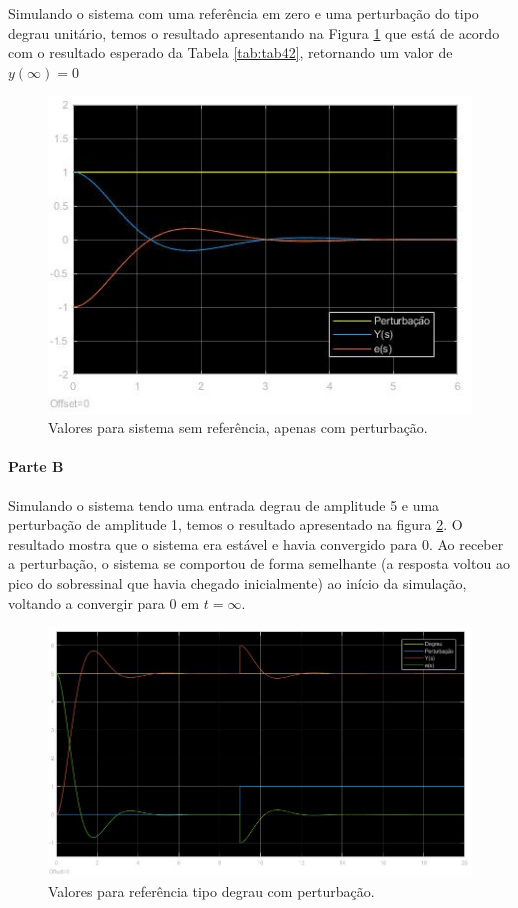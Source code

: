 \documentclass[
]{book}
\theoremstyle{definition}
\theoremstyle{definition}
\theoremstyle{definition}
\theoremstyle{remark}
\begin{document}
Simulando o sistema com uma referência em zero e uma perturbação do tipo degrau unitário, temos o resultado apresentando na Figura \ref{fig:fig43A1} que está de acordo com o resultado esperado da Tabela \ref{tab:tab42}, retornando um valor de \(y(\infty) = 0\)

\begin{figure}
\includegraphics[width=0.8\linewidth]{Imagens/Lab4/Resolução/prob3A1} \caption{Valores para sistema sem referência, apenas com perturbação.}\label{fig:fig43A1}
\end{figure}

\hypertarget{parte-b-2}{%
\paragraph*{Parte B}\label{parte-b-2}}

Simulando o sistema tendo uma entrada degrau de amplitude 5 e uma perturbação de amplitude 1, temos o resultado apresentado na figura \ref{fig:fig43B1}. O resultado mostra que o sistema era estável e havia convergido para 0. Ao receber a perturbação, o sistema se comportou de forma semelhante (a resposta voltou ao pico do sobressinal que havia chegado inicialmente) ao início da simulação, voltando a convergir para 0 em \(t=\infty\).

\begin{figure}
\includegraphics[width=0.8\linewidth]{Imagens/Lab4/Resolução/prob3B1} \caption{Valores para referência tipo degrau com perturbação.}\label{fig:fig43B1}
\end{figure}
\end{document}
